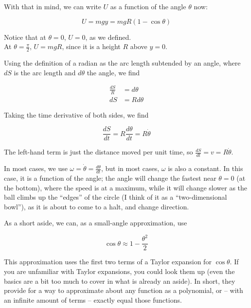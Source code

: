 With that in mind, we can write $U$ as a function of the angle $\theta$ now:

\begin{equation}
U = m g y = m g R (1 - \cos \theta)
\end{equation}

Notice that at $\theta = 0$, $U = 0$, as we defined.\\
At $\displaystyle \theta = \frac{\pi}{2}$, $U = m g R$, since it is a height $R$ above $y = 0$.

Using the definition of a radian as the arc length subtended by an angle, where $dS$ is the arc length and $d\theta$ the angle, we find

\begin{align}
\frac{dS}{R} &= d\theta\\
dS &= R d\theta
\end{align}

Taking the time derivative of both sides, we find

\begin{equation}
\frac{dS}{dt} = R \frac{d\theta}{dt} = R \dot{\theta}
\end{equation}

The left-hand term is just the distance moved per unit time, so $\displaystyle \frac{dS}{dt} = v = R \dot{\theta}$.

In most cases, we use $\displaystyle \omega = \dot{\theta} = \frac{d\theta}{dt}$, but in most cases, $\omega$ is also a constant. In this case, it is a function of the angle; the angle will change the fastest near $\theta = 0$ (at the bottom), where the speed is at a maximum, while it will change slower as the ball climbs up the ``edges'' of the circle (I think of it as a ``two-dimensional bowl''), as it is about to come to a halt, and change direction.

As a short aside, we can, as a small-angle approximation, use

\begin{equation}
\cos \theta \approx 1 - \frac{\theta^2}{2}
\end{equation}

This approximation uses the first two terms of a Taylor expansion for $\cos \theta$. If you are unfamiliar with Taylor expansions, you could look them up (even the basics are a bit too much to cover in what is already an aside). In short, they provide for a way to approximate about any function as a polynomial, or -- with an infinite amount of terms -- exactly equal those functions.

